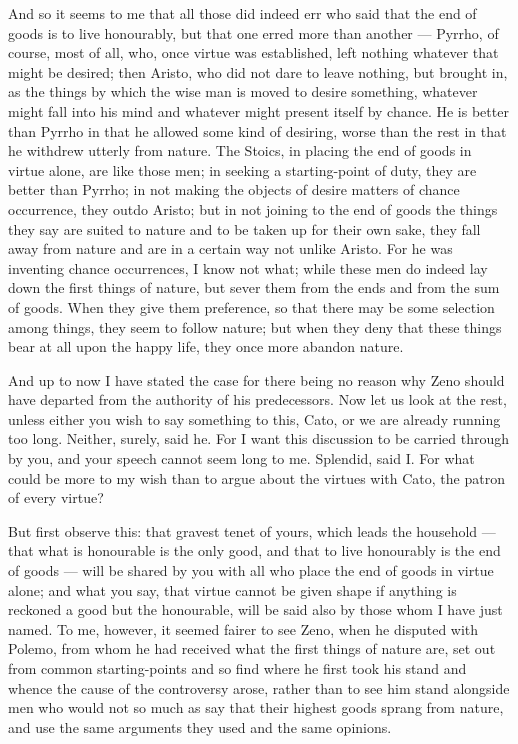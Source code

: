  And so it seems to me that all those did indeed err who said that the end of goods is to live honourably, but that one erred more than another — Pyrrho, of course, most of all, who, once virtue was established, left nothing whatever that might be desired; then Aristo, who did not dare to leave nothing, but brought in, as the things by which the wise man is moved to desire something, whatever might fall into his mind and whatever might present itself by chance. He is better than Pyrrho in that he allowed some kind of desiring, worse than the rest in that he withdrew utterly from nature. The Stoics, in placing the end of goods in virtue alone, are like those men; in seeking a starting-point of duty, they are better than Pyrrho; in not making the objects of desire matters of chance occurrence, they outdo Aristo; but in not joining to the end of goods the things they say are suited to nature and to be taken up for their own sake, they fall away from nature and are in a certain way not unlike Aristo. For he was inventing chance occurrences, I know not what; while these men do indeed lay down the first things of nature, but sever them from the ends and from the sum of goods. When they give them preference, so that there may be some selection among things, they seem to follow nature; but when they deny that these things bear at all upon the happy life, they once more abandon nature.

 And up to now I have stated the case for there being no reason why Zeno should have departed from the authority of his predecessors. Now let us look at the rest, unless either you wish to say something to this, Cato, or we are already running too long. Neither, surely, said he. For I want this discussion to be carried through by you, and your speech cannot seem long to me. Splendid, said I. For what could be more to my wish than to argue about the virtues with Cato, the patron of every virtue?

 But first observe this: that gravest tenet of yours, which leads the household — that what is honourable is the only good, and that to live honourably is the end of goods — will be shared by you with all who place the end of goods in virtue alone; and what you say, that virtue cannot be given shape if anything is reckoned a good but the honourable, will be said also by those whom I have just named. To me, however, it seemed fairer to see Zeno, when he disputed with Polemo, from whom he had received what the first things of nature are, set out from common starting-points and so find where he first took his stand and whence the cause of the controversy arose, rather than to see him stand alongside men who would not so much as say that their highest goods sprang from nature, and use the same arguments they used and the same opinions.

